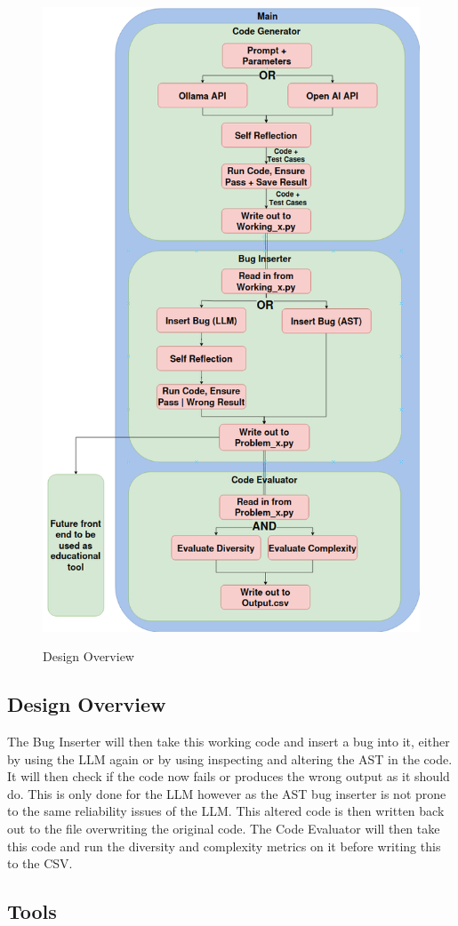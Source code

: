 \documentclass[12pt]{extarticle}
\begin{document}
\begin{figure}[htbp]
\centering
\includegraphics[width=0.7\linewidth]{Images/Tall_Design.png}
\label{fig:tall_design}
\caption{Design Overview}
\end{figure}

\subsection{Design Overview}

The Bug Inserter will then take this working code and insert a bug into it, either by using the LLM again or by using inspecting and altering the AST in the code. It will then check if the code now fails or produces the wrong output as it should do. This is only done for the LLM however as the AST bug inserter is not prone to the same reliability issues of the LLM. This altered code is then written back out to the file overwriting the original code. The Code Evaluator will then take this code and run the diversity and complexity metrics on it before writing this to the CSV.

\subsection{Tools}
\end{document}
